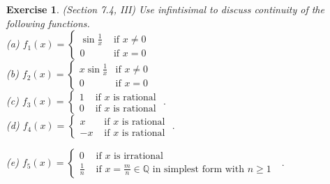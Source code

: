 \documentclass[a4paper, 11pt, openany]{book}
\theoremstyle{plain}
\newtheorem{exercise}{Exercise}[chapter]
\theoremstyle{plain}
\newcommand{\Q}{\mathbb{Q}}
\begin{document}
  \begin{exercise}
    (Section 7.4, III)
    Use infintisimal to discuss continuity of the following functions. \\
    (a) $f_1(x)=\begin{cases}
      \sin \frac{1}{x} & \text{ if } x \not =0 \\
      0 & \text{ if } x=0
        \end{cases}$ \\
    (b) $f_2 (x)= \begin{cases}
      x\sin \frac{1}{x} & \text{if } x \not = 0 \\
      0 & \text{if } x=0
    \end{cases}$ \\
    (c) $f_3(x)= \begin{cases}
      1 & \text{ if $x$ is rational }   \\
      0 & \text{ if $x$ is rational }
    \end{cases}.$ \\

    (d) $f_4(x)= \begin{cases}
      x & \text{ if $x$ is rational }   \\
      -x & \text{ if $x$ is rational }
    \end{cases}.$

    (e) $f_5(x)= \begin{cases}
      0 & \text{ if $x$ is irrational }   \\
      \frac{1}{n} & \text{ if $x=\frac{m}{n} \in \Q$ in simplest form with $n\geq 1$ }
    \end{cases}.$
  \end{exercise}
\end{document}

